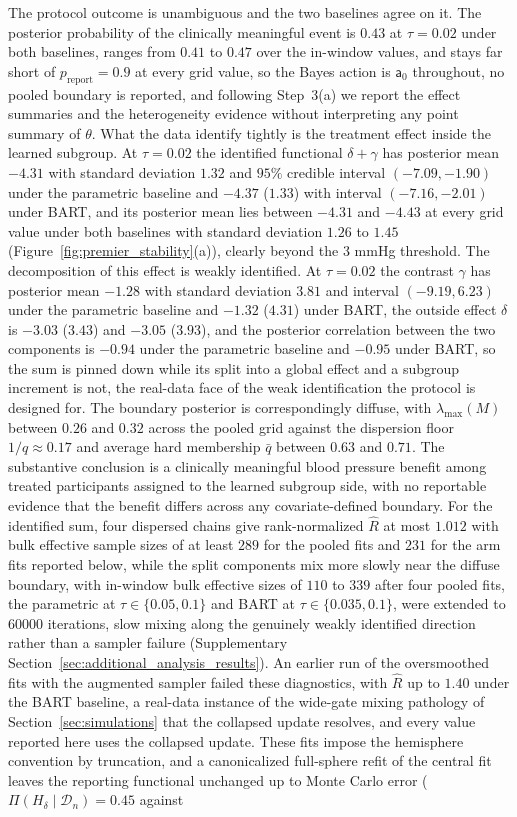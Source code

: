 \documentclass[11pt]{article}
\theoremstyle{definition}
\theoremstyle{plain}
\begin{document}
The protocol outcome is unambiguous and the two baselines agree on it. The posterior probability of the clinically meaningful event is $0.43$ at $\tau=0.02$ under both baselines, ranges from $0.41$ to $0.47$ over the in-window values, and stays far short of $p_{\mathrm{report}}=0.9$ at every grid value, so the Bayes action is $\mathsf a_0$ throughout, no pooled boundary is reported, and following Step~3(a) we report the effect summaries and the heterogeneity evidence without interpreting any point summary of $\theta$. What the data identify tightly is the treatment effect inside the learned subgroup. At $\tau=0.02$ the identified functional $\delta+\gamma$ has posterior mean $-4.31$ with standard deviation $1.32$ and $95\%$ credible interval $(-7.09,-1.90)$ under the parametric baseline and $-4.37$ ($1.33$) with interval $(-7.16,-2.01)$ under BART, and its posterior mean lies between $-4.31$ and $-4.43$ at every grid value under both baselines with standard deviation $1.26$ to $1.45$ (Figure~\ref{fig:premier_stability}(a)), clearly beyond the $3$ mmHg threshold. The decomposition of this effect is weakly identified. At $\tau=0.02$ the contrast $\gamma$ has posterior mean $-1.28$ with standard deviation $3.81$ and interval $(-9.19,6.23)$ under the parametric baseline and $-1.32$ ($4.31$) under BART, the outside effect $\delta$ is $-3.03$ ($3.43$) and $-3.05$ ($3.93$), and the posterior correlation between the two components is $-0.94$ under the parametric baseline and $-0.95$ under BART, so the sum is pinned down while its split into a global effect and a subgroup increment is not, the real-data face of the weak identification the protocol is designed for. The boundary posterior is correspondingly diffuse, with $\lambda_{\max}(M)$ between $0.26$ and $0.32$ across the pooled grid against the dispersion floor $1/q\approx0.17$ and average hard membership $\bar q$ between $0.63$ and $0.71$. The substantive conclusion is a clinically meaningful blood pressure benefit among treated participants assigned to the learned subgroup side, with no reportable evidence that the benefit differs across any covariate-defined boundary. For the identified sum, four dispersed chains give rank-normalized $\widehat R$ at most $1.012$ with bulk effective sample sizes of at least $289$ for the pooled fits and $231$ for the arm fits reported below, while the split components mix more slowly near the diffuse boundary, with in-window bulk effective sizes of $110$ to $339$ after four pooled fits, the parametric at $\tau\in\{0.05,0.1\}$ and BART at $\tau\in\{0.035,0.1\}$, were extended to $60000$ iterations, slow mixing along the genuinely weakly identified direction rather than a sampler failure (Supplementary Section~\ref{sec:additional_analysis_results}). An earlier run of the oversmoothed fits with the augmented sampler failed these diagnostics, with $\widehat R$ up to $1.40$ under the BART baseline, a real-data instance of the wide-gate mixing pathology of Section~\ref{sec:simulations} that the collapsed update resolves, and every value reported here uses the collapsed update. These fits impose the hemisphere convention by truncation, and a canonicalized full-sphere refit of the central fit leaves the reporting functional unchanged up to Monte Carlo error ($\Pi(H_\delta\mid\mathcal D_n)=0.45$ against 
\end{document}
